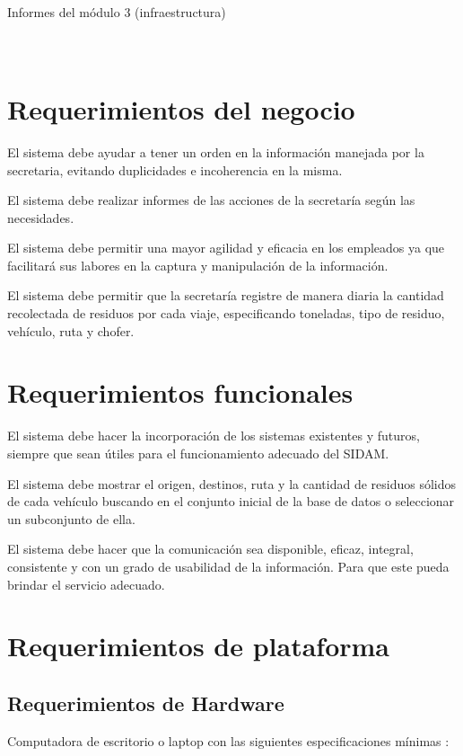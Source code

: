 \textbullet Informes del módulo 3 (infraestructura)\\\\\\

\section{Requerimientos del negocio}

\textbullet El sistema debe ayudar a  tener un orden en la información manejada por la secretaria, evitando duplicidades e incoherencia en la misma.

\textbullet El sistema debe realizar informes de las acciones de la secretaría  según las necesidades.

\textbullet El sistema debe permitir una mayor agilidad y eficacia en los empleados ya que facilitará sus labores en la captura y manipulación de la información.

\textbullet El sistema debe permitir que la secretaría registre de manera diaria  la cantidad recolectada de residuos por cada viaje, especificando toneladas, tipo de residuo, vehículo, ruta y chofer.

\section{Requerimientos funcionales}

\textbullet El sistema  debe hacer la incorporación de los sistemas existentes y futuros, siempre que sean útiles para el funcionamiento adecuado del SIDAM.

\textbullet El sistema debe mostrar el  origen, destinos, ruta y la cantidad de residuos sólidos de cada vehículo buscando en el conjunto inicial de la base de datos o seleccionar un subconjunto de ella.

\textbullet El sistema debe hacer que la comunicación sea disponible, eﬁcaz, integral, consistente y con un grado de usabilidad de la información. Para que este pueda brindar el servicio adecuado.

\section{Requerimientos de plataforma}


\subsection{Requerimientos de Hardware}
Computadora de escritorio o laptop con las siguientes especificaciones mínimas :\\

